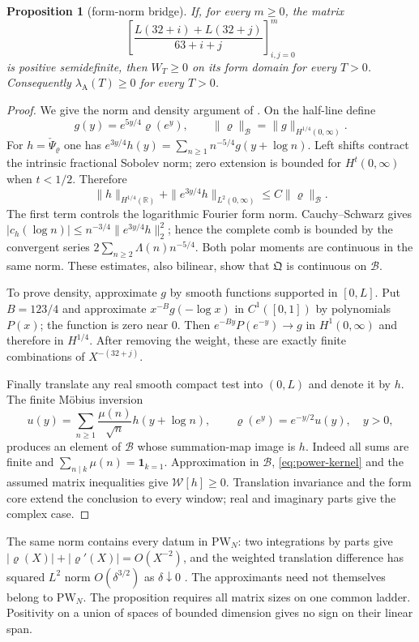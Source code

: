 \documentclass[11pt]{amsart}
\newtheorem{proposition}[theorem]{Proposition}
\theoremstyle{definition}
\theoremstyle{remark}
\newcommand{\R}{\mathbb R}
\newcommand{\lamA}{\lambda_{\mathrm A}(T)}
\begin{document}
\begin{proposition}[form-norm bridge]\label{prop:power-bridge}
If, for every $m\ge0$, the matrix
\[
 \left[\frac{L(32+i)+L(32+j)}{63+i+j}\right]_{i,j=0}^m
\]
is positive semidefinite, then $W_T\ge0$ on its form domain for every $T>0$.
Consequently $\lamA\ge0$ for every $T>0$.
\end{proposition}
\begin{proof}
We give the norm and density argument of \cite[\S\S1--3,6]{PowerBridge}.
On the half-line define
\[
 g(y)=e^{5y/4}\varrho(e^y),\qquad
 \|\varrho\|_{\mathcal B}=\|g\|_{H^{1/4}(0,\infty)}.
\]
For $h=\check\Psi_\varrho$ one has
$e^{3y/4}h(y)=\sum_{n\ge1}n^{-5/4}g(y+\log n)$.
Left shifts contract the intrinsic fractional Sobolev norm; zero extension is bounded for
$H^t(0,\infty)$ when $t<1/2$. Therefore
\[
 \|h\|_{H^{1/4}(\R)}+\|e^{3y/4}h\|_{L^2(0,\infty)}
 \le C\|\varrho\|_{\mathcal B}.
\]
The first term controls the logarithmic Fourier form norm. Cauchy--Schwarz gives
$|c_h(\log n)|\le n^{-3/4}\|e^{3y/4}h\|_2^2$; hence the complete comb is bounded by the convergent
series $2\sum_{n\ge2}\Lambda(n)n^{-5/4}$. Both polar moments are continuous in the same norm.
These estimates, also bilinear, show that $\mathfrak Q$ is continuous on $\mathcal B$.

To prove density, approximate $g$ by smooth functions supported in $[0,L]$. Put $B=123/4$ and
approximate $x^{-B}g(-\log x)$ in $C^1([0,1])$ by polynomials $P(x)$; the function is zero near $0$.
Then $e^{-By}P(e^{-y})\to g$ in $H^1(0,\infty)$ and therefore in $H^{1/4}$.
After removing the weight, these are exactly finite combinations of $X^{-(32+j)}$.

Finally translate any real smooth compact test into $(0,L)$ and denote it by $h$.
The finite M\"obius inversion
\[
 u(y)=\sum_{n\ge1}\frac{\mu(n)}{\sqrt n}h(y+\log n),\qquad
 \varrho(e^y)=e^{-y/2}u(y),\quad y>0,
\]
produces an element of $\mathcal B$ whose summation-map image is $h$.
Indeed all sums are finite and $\sum_{n\mid k}\mu(n)=\mathbf1_{k=1}$.
Approximation in $\mathcal B$, \eqref{eq:power-kernel} and the assumed matrix inequalities give
$\mathcal W[h]\ge0$. Translation invariance and the form core extend the conclusion to every window;
real and imaginary parts give the complex case.
\end{proof}

The same norm contains every datum in $\mathrm{PW}_N$: two integrations by parts give
$|\varrho(X)|+|\varrho'(X)|=O(X^{-2})$, and the weighted translation difference has squared
$L^2$ norm $O(\delta^{3/2})$ as $\delta\downarrow0$ \cite[\S2]{PowerBridge}.
The approximants need not themselves belong to $\mathrm{PW}_N$.
The proposition requires all matrix sizes on one common ladder. Positivity on a union of spaces
of bounded dimension gives no sign on their linear span.
\end{document}

